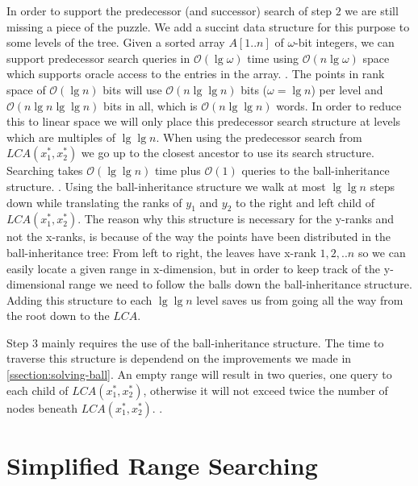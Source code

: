 
In order to support the predecessor (and successor) search of step $2$ we are still missing a piece of the puzzle. We add a succint data structure for this purpose to some levels of the tree. Given a sorted array $A[1..n]$ of $\omega$-bit integers, we can support predecessor search queries in $\mathcal{O}(\lg \omega)$ time using $\mathcal{O}(n \lg \omega)$ space which supports oracle access to the entries in the array. . The points in rank space of $\mathcal{O}(\lg n)$ bits will use $\mathcal{O}(n \lg \lg n)$ bits ($\omega = \lg n$) per level and $\mathcal{O}(n \lg n \lg \lg n)$ bits in all, which is $\mathcal{O}(n \lg \lg n)$ words. In order to reduce this to linear space we will only place this predecessor search structure at levels which are multiples of $\lg \lg n$. When using the predecessor search from $LCA(x^*_1, x^*_2)$ we go up to the closest ancestor to use its search structure. Searching takes $\mathcal{O}(\lg \lg n)$ time plus $\mathcal{O}(1)$ queries to the ball-inheritance structure. . Using the ball-inheritance structure we walk at most $\lg \lg n$ steps down while translating the ranks of $y_1$ and $y_2$ to the right and left child of $LCA(x^*_1, x^*_2)$. The reason why this structure is necessary for the y-ranks and not the x-ranks, is because of the way the points have been distributed in the ball-inheritance tree: From left to right, the leaves have x-rank $1,2,..n$ so we can easily locate a given range in x-dimension, but in order to keep track of the y-dimensional range we need to follow the balls down the ball-inheritance structure. Adding this structure to each $\lg \lg n$ level saves us from going all the way from the root down to the $LCA$. 

Step $3$ mainly requires the use of the ball-inheritance structure. The time to traverse this structure is dependend on the improvements we made in \ref{ssection:solving-ball}. An empty range will result in two queries, one query to each child of $LCA(x^*_1, x^*_2)$, otherwise it will not exceed twice the number of nodes beneath $LCA(x^*_1, x^*_2)$.  .

\section{Simplified Range Searching}

